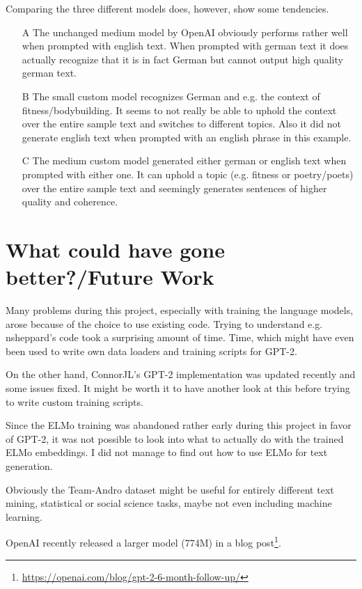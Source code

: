 \documentclass{scrartcl}
\begin{document}
Comparing the three different models does, however, show some tendencies. 
\begin{itemize}
	\item[A] The unchanged medium model by OpenAI obviously performs rather well when prompted with english text. When prompted with german text it does actually recognize that it is in fact German but cannot output high quality german text.
	\item[B] The small custom model recognizes German and e.g. the context of fitness/bodybuilding. It seems to not really be able to uphold the context over the entire sample text and switches to different topics. Also it did not generate english text when prompted with an english phrase in this example.
	\item[C] The medium custom model generated either german or english text when prompted with either one. It can uphold a topic (e.g. fitness or poetry/poets) over the entire sample text and seemingly generates sentences of higher quality and coherence.
\end{itemize}


\section{What could have gone better?/Future Work}
\label{sec:FW}
Many problems during this project, especially with training the language models, arose because of the choice to use existing code. Trying to understand e.g. nsheppard's code took a surprising amount of time. Time, which might have even been used to write own data loaders and training scripts for GPT-2.

On the other hand, ConnorJL's GPT-2 implementation was updated recently and some issues fixed. It might be worth it to have another look at this before trying to write custom training scripts.

Since the ELMo training was abandoned rather early during this project in favor of GPT-2, it was not possible to look into what to actually do with the trained ELMo embeddings. I did not manage to find out how to use ELMo for text generation.

Obviously the Team-Andro dataset might be useful for entirely different text mining, statistical or social science tasks, maybe not even including machine learning.

OpenAI recently released a larger model (774M) in a blog post\footnote{\url{https://openai.com/blog/gpt-2-6-month-follow-up/}}.
\end{document}

